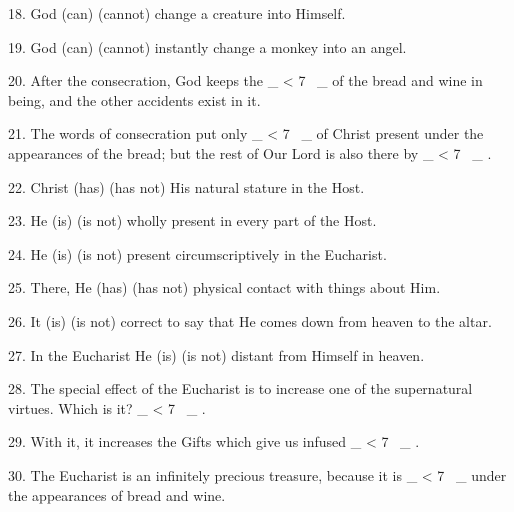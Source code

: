 \documentclass[a5paper]{article}
\newcommand\textjarman[1]{{\jarman #1}}
\newcounter{z}
\newcommand\spaces[1]{ \_\loop \ifnum\value{z} < #1
~\_%
\stepcounter{z}%
\repeat%
\setcounter{z}{0}}
\begin{document}
18.  God  (\textjarman{can}) (\textjarman{cannot}) 
change a creature into Himself. 

19. God (\textjarman{can})  (\textjarman{cannot}) instantly  change  a
monkey into an angel. 

20. After the consecration, God keeps the \spaces{7}  of
the bread and wine in being, and the other accidents exist in  it.  

21.  The
words of  consecration  put  only  \spaces{7}  of  Christ  present  under  the
appearances of the bread; but  the  rest  of  Our  Lord  is  also  there  by
\spaces{7}. 

22. Christ (\textjarman{has}) (\textjarman{has not}) His natural stature in  the  Host. 

23. 
He (\textjarman{is})  (\textjarman{is  not}) wholly present in every part of the Host. 

24. He  (\textjarman{is})  (\textjarman{is
not}) present circumscriptively in the Eucharist. 

25. There,  He  (\textjarman{has})  (\textjarman{has
not}) physical contact with things about Him. 

26. It (\textjarman{is})  (\textjarman{is  not})  correct
to say that He comes down from heaven to the altar. 

27. In the Eucharist  He (\textjarman{is})  (\textjarman{is  not})  distant from Himself in heaven. 

28. The special effect of  the
Eucharist is to increase one of  the  supernatural  virtues.  Which  is  it?
\spaces{7}. 

29. With  it,  it  increases  the  Gifts  which  give  us  infused
\spaces{7}. 

30. The Eucharist is an infinitely precious treasure,  because  it
is \spaces{7} under the appearances of bread and wine.

\newpage
\end{document}
